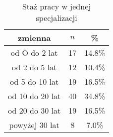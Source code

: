 \begin{table}[H]
\caption{Staż pracy w jednej specjalizacji}
\centering
\begin{tabular}{ | c | c | c |}
\hline
zmienna & $n$ & \% \\
\hline
od O do 2 lat  &  17  & 14.8\% \\
\hline
od 2 do 5 lat  &  12  & 10.4\% \\
\hline
od 5 do 10 lat  &  19  & 16.5\% \\
\hline
od 10 do 20 lat  &  40  & 34.8\% \\
\hline
od 20 do 30 lat  &  19  & 16.5\% \\
\hline
powyżej 30 lat  &  8  & 7.0\% \\
\hline
\end{tabular}
\label{tab:Q6}
\end{table}